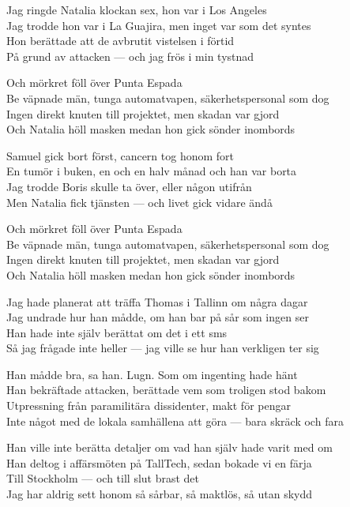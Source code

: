 \begin{lyrics}
Jag ringde Natalia klockan sex, hon var i Los Angeles\\
Jag trodde hon var i La Guajira, men inget var som det syntes\\
Hon berättade att de avbrutit vistelsen i förtid\\
På grund av attacken — och jag frös i min tystnad

Och mörkret föll över Punta Espada\\
Be väpnade män, tunga automatvapen, säkerhetspersonal som dog\\
Ingen direkt knuten till projektet, men skadan var gjord\\
Och Natalia höll masken medan hon gick sönder inombords

Samuel gick bort först, cancern tog honom fort\\
En tumör i buken, en och en halv månad och han var borta\\
Jag trodde Boris skulle ta över, eller någon utifrån\\
Men Natalia fick tjänsten — och livet gick vidare ändå

Och mörkret föll över Punta Espada\\
Be väpnade män, tunga automatvapen, säkerhetspersonal som dog\\
Ingen direkt knuten till projektet, men skadan var gjord\\
Och Natalia höll masken medan hon gick sönder inombords

Jag hade planerat att träffa Thomas i Tallinn om några dagar\\
Jag undrade hur han mådde, om han bar på sår som ingen ser\\
Han hade inte själv berättat om det i ett sms\\
Så jag frågade inte heller — jag ville se hur han verkligen ter sig

Han mådde bra, sa han. Lugn. Som om ingenting hade hänt\\
Han bekräftade attacken, berättade vem som troligen stod bakom\\
Utpressning från paramilitära dissidenter, makt för pengar\\
Inte något med de lokala samhällena att göra — bara skräck och fara

Han ville inte berätta detaljer om vad han själv hade varit med om\\
Han deltog i affärsmöten på TallTech, sedan bokade vi en färja\\
Till Stockholm — och till slut brast det\\
Jag har aldrig sett honom så sårbar, så maktlös, så utan skydd


\end{lyrics}
